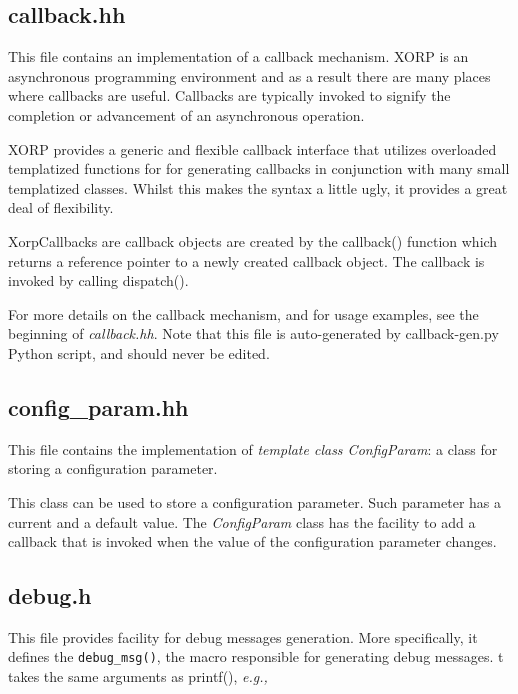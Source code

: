 \documentclass[11pt]{article}
\newcommand{\eg}{\emph{e.g.,}\xspace}
\begin{document}
\subsection{callback.hh}

This file contains an implementation of a callback mechanism.
XORP is an asynchronous programming environment and as a result there
are many places where callbacks are useful.  Callbacks are typically
invoked to signify the completion or advancement of an asynchronous
operation.

XORP provides a generic and flexible callback interface that utilizes
overloaded templatized functions for for generating callbacks
in conjunction with many small templatized classes. Whilst this makes
the syntax a little ugly, it provides a great deal of flexibility.

XorpCallbacks are callback objects are created by the callback()
function which returns a reference pointer to a newly created
callback object.  The callback is invoked by calling dispatch().

For more details on the callback mechanism, and for usage examples, see
the beginning of \emph{callback.hh}.
Note that this file is auto-generated by callback-gen.py Python script,
and should never be edited.

\subsection{config\_param.hh}

This file contains the implementation of \emph{template class
ConfigParam}: a class for storing a configuration parameter.

This class can be used to store a configuration parameter.
Such parameter has a current and a default value.
The \emph{ConfigParam} class has the facility to add a callback that is
invoked when the value of the configuration parameter changes.

\subsection{debug.h}

This file provides facility for debug messages generation.
More specifically, it defines the \verb=debug_msg()=, the macro
responsible for generating debug messages. 
t takes the same arguments as printf(), \eg \\
\end{document}
